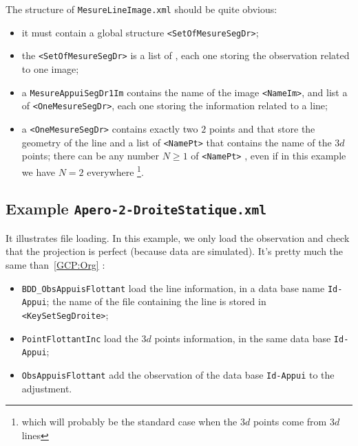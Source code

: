 The structure of {\tt MesureLineImage.xml} should be quite obvious:

\begin{itemize}
   \item it must contain a global structure {\tt <SetOfMesureSegDr>};
   \item the {\tt <SetOfMesureSegDr>} is a list of {\tt <MesureAppuiSegDr1Im>}, each one
         storing the observation related to one image;
   \item a  {\tt MesureAppuiSegDr1Im} contains the name of the image {\tt <NameIm>}, and list a of {\tt <OneMesureSegDr>}, each one storing the information related to a line;

   \item a   {\tt <OneMesureSegDr>} contains exactly two $2$ points {\tt <Pt1Im>} and {\tt <Pt2Im>} that store
            the geometry of the line and a list of {\tt <NamePt>} that contains the name of the $3d$ points;
            there can be any number $N \geq 1$ of  {\tt <NamePt>} , even if in this example we
             have $N=2$ everywhere
             \footnote{which will probably be the standard case when the $3d$ points come from $3d$ lines}.

\end{itemize}


\subsection{Example {\tt Apero-2-DroiteStatique.xml}}

\label{Apero-2-DroiteStatique}

It illustrates file loading.
In this example, we only load the observation and check that the projection is perfect (because data
are simulated). It's pretty much the same than~\ref{GCP:Org} :

\begin{itemize}
   \item {\tt BDD\_ObsAppuisFlottant} load the line information, in a data base name {\tt Id-Appui};
         the name of the file containing the line is stored in {\tt  <KeySetSegDroite>};
   \item {\tt PointFlottantInc} load the $3d$ points information, in the same data base {\tt Id-Appui};
   \item {\tt ObsAppuisFlottant} add the observation of the data base {\tt Id-Appui} to the adjustment.
\end{itemize}

